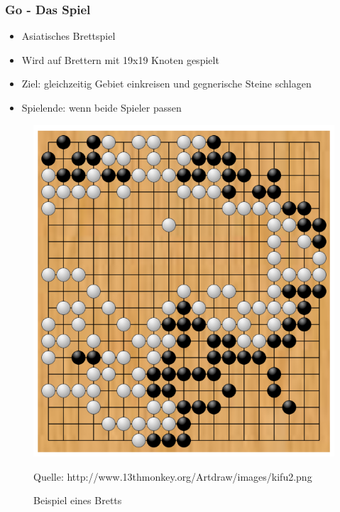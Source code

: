 \documentclass[compress]{beamer}
\begin{document}
\begin{frame}
	\frametitle{Go - Das Spiel}

	\begin{itemize}
		\item Asiatisches Brettspiel
		\item Wird auf Brettern mit 19x19 Knoten gespielt
		\item Ziel: gleichzeitig Gebiet einkreisen und gegnerische Steine schlagen
		\item Spielende: wenn beide Spieler passen
	\end{itemize}

	\begin{figure}
		\begin{center}
			\includegraphics[scale=0.15]{board.png}
		\end{center}
		\caption{Beispiel eines Bretts}
		\begin{footnotesize}		 
		Quelle: http://www.13thmonkey.org/Artdraw/images/kifu2.png
		\end{footnotesize}
		\label{fig:Brett}
	\end{figure}
\end{frame}
\end{document}
